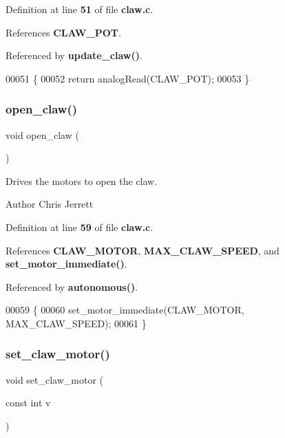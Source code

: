Definition at line \textbf{ 51} of file \textbf{ claw.\+c}.



References \textbf{ C\+L\+A\+W\+\_\+\+P\+OT}.



Referenced by \textbf{ update\+\_\+claw()}.


\begin{DoxyCode}
00051                            \{
00052   \textcolor{keywordflow}{return} analogRead(CLAW_POT);
00053 \}
\end{DoxyCode}
\mbox{\label{claw_8h_a03023ca28f671b9fa7bac07782ccd8c1}} 
\subsubsection{open\+\_\+claw()}
{\footnotesize\ttfamily void open\+\_\+claw (\begin{DoxyParamCaption}{ }\end{DoxyParamCaption})}



Drives the motors to open the claw. 

\begin{DoxyAuthor}{Author}
Chris Jerrett 
\end{DoxyAuthor}


Definition at line \textbf{ 59} of file \textbf{ claw.\+c}.



References \textbf{ C\+L\+A\+W\+\_\+\+M\+O\+T\+OR}, \textbf{ M\+A\+X\+\_\+\+C\+L\+A\+W\+\_\+\+S\+P\+E\+ED}, and \textbf{ set\+\_\+motor\+\_\+immediate()}.



Referenced by \textbf{ autonomous()}.


\begin{DoxyCode}
00059                  \{
00060   set_motor_immediate(CLAW_MOTOR, MAX_CLAW_SPEED);
00061 \}
\end{DoxyCode}
\mbox{\label{claw_8h_a3a57f998b1884d39b0cc786689f7086f}} 
\subsubsection{set\+\_\+claw\+\_\+motor()}
{\footnotesize\ttfamily void set\+\_\+claw\+\_\+motor (\begin{DoxyParamCaption}\item[{const int}]{v }\end{DoxyParamCaption})}



